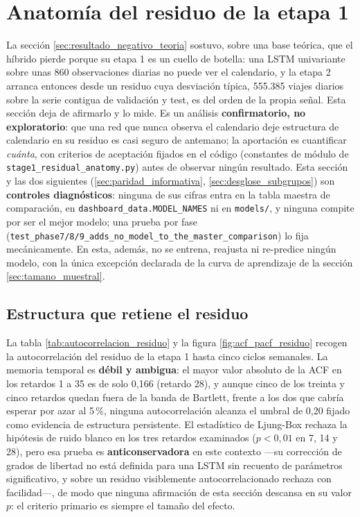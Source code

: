\section{Anatomía del residuo de la etapa 1}\label{sec:anatomia_residuo_etapa1}

La sección \ref{sec:resultado_negativo_teoria} sostuvo, sobre una base teórica, que el
híbrido pierde porque su etapa 1 es un cuello de botella: una LSTM univariante sobre unas
860 observaciones diarias no puede ver el calendario, y la etapa 2 arranca entonces desde
un residuo cuya desviación típica, 555.385 viajes diarios sobre la serie contigua de
validación y test, es del orden de la propia señal. Esta sección deja de afirmarlo y lo
mide. Es un análisis \textbf{confirmatorio, no exploratorio}: que una red que nunca observa
el calendario deje estructura de calendario en su residuo es casi seguro de antemano; la
aportación es cuantificar \emph{cuánta}, con criterios de aceptación fijados en el código
(constantes de módulo de \texttt{stage1\_residual\_anatomy.py}) antes de observar ningún
resultado. Esta sección y las dos siguientes (\ref{sec:paridad_informativa},
\ref{sec:desglose_subgrupos}) son \textbf{controles diagnósticos}: ninguna de sus cifras
entra en la tabla maestra de comparación, en \texttt{dashboard\_data.MODEL\_NAMES} ni en
\texttt{models/}, y ninguna compite por ser el mejor modelo; una prueba por fase
(\texttt{test\_phase7/8/9\_adds\_no\_model\_to\_the\_master\_comparison}) lo fija
mecánicamente. En esta, además, no se entrena, reajusta ni re-predice ningún modelo, con
la única excepción declarada de la curva de aprendizaje de la sección
\ref{sec:tamano_muestral}.

\subsection{Estructura que retiene el residuo}\label{sec:residuo_estructura}

La tabla \ref{tab:autocorrelacion_residuo} y la figura \ref{fig:acf_pacf_residuo} recogen
la autocorrelación del residuo de la etapa 1 hasta cinco ciclos semanales. La memoria
temporal es \textbf{débil y ambigua}: el mayor valor absoluto de la ACF en los retardos 1
a 35 es de solo 0,166 (retardo 28), y aunque cinco de los treinta y cinco retardos quedan
fuera de la banda de Bartlett, frente a los dos que cabría esperar por azar al 5\,\%,
ninguna autocorrelación alcanza el umbral de 0,20 fijado como evidencia de estructura
persistente. El estadístico de Ljung-Box rechaza la hipótesis de ruido blanco en los tres
retardos examinados ($p < 0{,}01$ en 7, 14 y 28), pero esa prueba es
\textbf{anticonservadora} en este contexto —su corrección de grados de libertad no está
definida para una LSTM sin recuento de parámetros significativo, y sobre un residuo
visiblemente autocorrelacionado rechaza con facilidad—, de modo que ninguna afirmación de
esta sección descansa en su valor $p$: el criterio primario es siempre el tamaño del
efecto.

